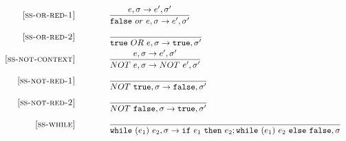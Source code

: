 \documentclass{article}
\begin{document}
\begin{figure}
\[\begin{array}{r@{\qquad\qquad}l}
\ssrule{ss-or-red-1}{
  \sstep{e}{\sigma}{e'}{\sigma'}
}{
  \sstep{\false~or~e}{\sigma}{e'}{\sigma'}
}

\ssrule{ss-or-red-2}{
}{
  \sstep{\true~OR~e}{\sigma}{\true}{\sigma'}
}

\ssrule{ss-not-context}{
  \sstep{e}{\sigma}{e'}{\sigma'}
}{
  \sstep{NOT~e}{\sigma}{NOT~e'}{\sigma'}
}

\ssrule{ss-not-red-1}{
}{
  \sstep{NOT~\true}{\sigma}{\false}{\sigma'}
}

\ssrule{ss-not-red-2}{
}{
  \sstep{NOT~\false}{\sigma}{\true}{\sigma'}
}

\ssrule{ss-while}{
}{
  \sstep{\whilee{e_1}{e_2}}{\sigma}{\ife{e_1}{e_2;\whilee{e_1}{e_2}}{\false}}{\sigma}
}
\end{array}
\]
\end{figure}
\end{document}
